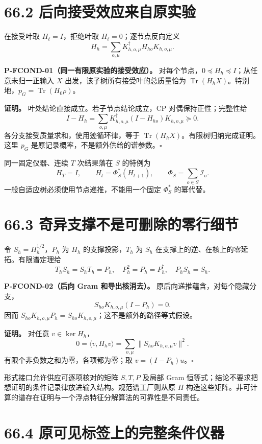 \documentclass[
  11pt,
  oneside]{book}
\begin{document}
\section{66.2 后向接受效应来自原实验}

在接受叶取 \(H_\ell=I\)，拒绝叶取 \(H_\ell=0\)；逐节点反向定义 \[
H_h=\sum_{o,\mu}K_{h,o,\mu}^{\dagger}H_{ho}K_{h,o,\mu}.
\]

\protect\hypertarget{p-fcond-01}{}{}
\textbf{P-FCOND-01（同一有限原实验的接受效应）。}
对每个节点，\(0\preceq H_h\preceq I\)；从任意未归一正输入 \(X\)
出发，该子树所有接受叶的总质量恰为
\(\operatorname{Tr}(H_hX)\)。特别地，\(p_G=\operatorname{Tr}(H_0\rho)\)。

\textbf{证明。} 叶处结论直接成立。若子节点结论成立，CP
对偶保持正性；完整性给 \[
I-H_h=\sum_{o,\mu}K_{h,o,\mu}^{\dagger}(I-H_{ho})K_{h,o,\mu}\succeq0.
\] 各分支接受质量求和，使用迹循环律，等于
\(\operatorname{Tr}(H_hX)\)。有限树归纳完成证明。这里 \(p_G\)
是原记录概率，不是额外供给的谱参数。\(\square\)

同一固定仪器、连续 \(T\) 次结果落在 \(S\) 的特例为 \[
H_T=I,\qquad H_t=\Phi_S^*(H_{t+1}),\qquad
\Phi_S=\sum_{o\in S}\mathcal I_o.
\] 一般自适应树必须使用节点递推，不能用一个固定 \(\Phi_S^*\) 的幂代替。

\section{66.3 奇异支撑不是可删除的零行细节}

令 \(S_h=H_h^{1/2}\)，\(P_h\) 为 \(H_h\) 的支撑投影，\(T_h\) 为 \(S_h\)
在支撑上的逆、在核上的零延拓。有限谱定理给 \[
T_hS_h=S_hT_h=P_h,\quad P_h^2=P_h=P_h^{\dagger},\quad P_hS_h=S_h.
\]

\protect\hypertarget{p-fcond-02}{}{} \textbf{P-FCOND-02（后向 Gram
和导出核消去）。} 原后向递推蕴含，对每个隐藏分支， \[
S_{ho}K_{h,o,\mu}(I-P_h)=0.
\] 因而
\(S_{ho}K_{h,o,\mu}P_h=S_{ho}K_{h,o,\mu}\)；这不是额外的路径等式假设。

\textbf{证明。} 对任意 \(v\in\ker H_h\)， \[
0=\langle v,H_hv\rangle
=\sum_{o,\mu}\|S_{ho}K_{h,o,\mu}v\|^2.
\] 有限个非负数之和为零，各项都为零；取 \(v=(I-P_h)u\)。\(\square\)

形式接口允许供应可逐项核对的矩阵 \(S,T,P\) 及局部 Gram
恒等式；结论不要求把想证明的条件记录律放进输入结构。规范谱工厂则从原
\(H\)
构造这些矩阵。非可计算的谱存在证明与一个浮点特征分解算法的可靠性是不同责任。

\section{66.4 原可见标签上的完整条件仪器}
\end{document}
